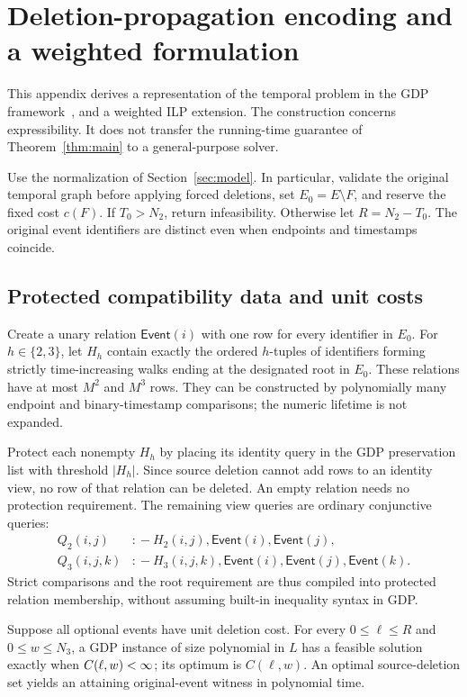 \section{Deletion-propagation encoding and a weighted formulation}
\label{app:gdp}

This appendix derives a representation of the temporal problem in the GDP
framework~\citep[Definition 4.1]{makhija2025gdp}, and a weighted ILP extension.
The construction concerns expressibility. It does not transfer the
running-time guarantee of Theorem~\ref{thm:main} to a general-purpose solver.

Use the normalization of Section~\ref{sec:model}. In particular, validate the
original temporal graph before applying forced deletions, set $E_0=E\setminus
F$, and reserve the fixed cost $c(F)$. If $T_0>N_2$, return infeasibility.
Otherwise let $R=N_2-T_0$. The original event identifiers are distinct even
when endpoints and timestamps coincide.

\subsection{Protected compatibility data and unit costs}

Create a unary relation $\mathsf{Event}(i)$ with one row for every identifier
in $E_0$. For $h\in\{2,3\}$, let $H_h$ contain exactly the ordered
$h$-tuples of identifiers forming strictly time-increasing walks ending at
the designated root in $E_0$. These relations have at most $M^2$ and $M^3$
rows. They can be constructed by polynomially many endpoint and
binary-timestamp comparisons; the numeric lifetime is not expanded.

Protect each nonempty $H_h$ by placing its identity query in the GDP
preservation list with threshold $|H_h|$. Since source deletion cannot add
rows to an identity view, no row of that relation can be deleted. An empty
relation needs no protection requirement. The remaining view queries are
ordinary conjunctive queries:
\begin{align*}
 Q_2(i,j)&\mathbin{:\!-}H_2(i,j),\mathsf{Event}(i),\mathsf{Event}(j),\\
 Q_3(i,j,k)&\mathbin{:\!-}H_3(i,j,k),\mathsf{Event}(i),
                 \mathsf{Event}(j),\mathsf{Event}(k).
\end{align*}
Strict comparisons and the root requirement are thus compiled into protected
relation membership, without assuming built-in inequality syntax in GDP.

\begin{proposition}\label{prop:gdp-encoding}
Suppose all optional events have unit deletion cost. For every
$0\le\ell\le R$ and $0\le w\le N_3$, a GDP instance of size polynomial in
$L$ has a feasible solution exactly when $C(\ell,w)<\infty$; its optimum is
$C(\ell,w)$. An optimal source-deletion set yields an attaining original-event
witness in polynomial time.
\end{proposition}

